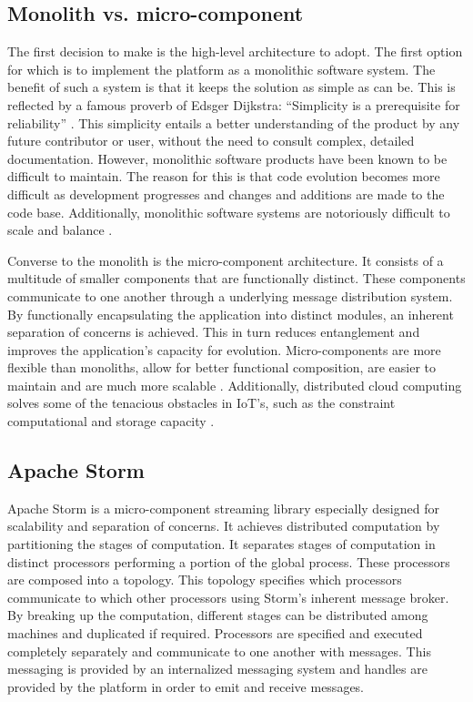 \subsection{Monolith vs. micro-component}
The first decision to make is the high-level architecture to adopt. The first option for which is to implement the platform as a monolithic software system. The benefit of such a system is that it keeps the solution as simple as can be. This is reflected by a famous proverb of Edsger Dijkstra: ``Simplicity is a prerequisite for reliability'' \cite{dijkstra}. This simplicity entails a better understanding of the product by any future contributor or user, without the need to consult complex, detailed documentation. However, monolithic software products have been known to be difficult to maintain. The reason for this is that code evolution becomes more difficult as development progresses and changes and additions are made to the code base. Additionally, monolithic software systems are notoriously difficult to scale and balance \cite{mono_vs_micro}.

Converse to the monolith is the micro-component architecture. It consists of a multitude of smaller components that are functionally distinct. These components communicate to one another through a underlying message distribution system. By functionally encapsulating the application into distinct modules, an inherent separation of concerns is achieved. This in turn reduces entanglement and improves the application's capacity for evolution. Micro-components are more flexible than monoliths, allow for better functional composition, are easier to maintain and are much more scalable \cite{mono_vs_micro}. Additionally, distributed cloud computing solves some of the tenacious obstacles in IoT's, such as the constraint computational and storage capacity \cite{benefits_cloud_to_iot}. 

\subsection{Apache Storm}
Apache Storm is a micro-component streaming library especially designed for scalability and separation of concerns. It achieves distributed computation by partitioning the stages of computation. It separates stages of computation in distinct processors performing a portion of the global process. These processors are composed into a topology. This topology specifies which processors communicate to which other processors using Storm's inherent message broker. By breaking up the computation, different stages can be distributed among machines and duplicated if required. Processors are specified and executed completely separately and communicate to one another with messages. This messaging is provided by an internalized messaging system and handles are provided by the platform in order to emit and receive messages.

